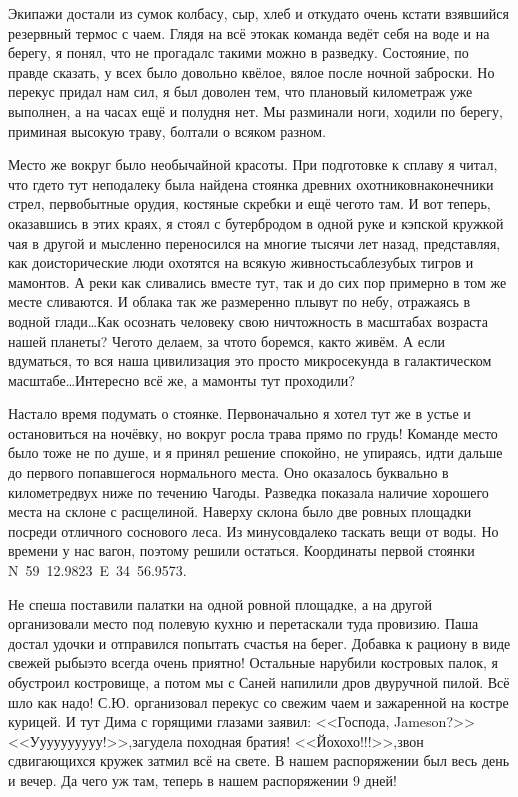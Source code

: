 Экипажи достали из сумок колбасу, сыр, хлеб и откуда\sdash то очень кстати взявшийся резервный термос с чаем. Глядя на всё это\mdash как команда ведёт себя на воде и на берегу, я понял, что не прогадал\mdash с такими можно в разведку. Состояние, по правде сказать, у всех было довольно квёлое, вялое после ночной заброски. Но перекус придал нам сил, я был доволен тем, что плановый километраж уже выполнен, а на часах ещё и полудня нет. Мы разминали ноги, ходили по берегу, приминая высокую траву, болтали о всяком разном.

Место же вокруг было необычайной красоты. При подготовке к сплаву я читал, что где\sdash то тут неподалеку была найдена стоянка древних охотников\mdash наконечники стрел, первобытные орудия, костяные скребки и ещё чего\sdash то там. И вот теперь, оказавшись в этих краях, я стоял с бутербродом в одной руке и кэпской кружкой чая в другой и мысленно переносился на многие тысячи лет назад, представляя, как доисторические люди охотятся на всякую живность\mdash саблезубых тигров и мамонтов. А реки как сливались вместе тут, так и до сих пор примерно в том же месте сливаются. И облака так же размеренно плывут по небу, отражаясь в водной глади\ldots Как осознать человеку свою ничтожность в масштабах возраста нашей планеты? Чего\sdash то делаем, за что\sdash то боремся, как\sdash то живём. А если вдуматься, то вся наша цивилизация \mdash это просто микросекунда в галактическом масштабе\ldots Интересно всё же, а мамонты тут проходили?

Настало время подумать о стоянке. Первоначально я хотел тут же в устье и остановиться на ночёвку, но вокруг росла трава прямо по грудь! Команде место было тоже не по душе, и я принял решение спокойно, не упираясь, идти дальше до первого попавшегося нормального места. Оно оказалось буквально в километре\sdash двух ниже по течению Чагоды. Разведка показала наличие хорошего места на склоне с расщелиной. Наверху склона было две ровных площадки посреди отличного соснового леса. Из минусов\mdash далеко таскать вещи от воды. Но времени у нас вагон, поэтому решили остаться. Координаты первой стоянки N~59\degree~12.9823\textprime~E~34\degree~56.9573\textprime. 

Не спеша поставили палатки на одной ровной площадке, а на другой организовали место под полевую кухню и перетаскали туда провизию. Паша достал удочки и отправился попытать счастья на берег. Добавка к рациону в виде свежей рыбы\mdash это всегда очень приятно! Остальные нарубили костровых палок, я обустроил костровище, а потом мы с Саней напилили дров двуручной пилой. Всё шло как надо! С.Ю. организовал перекус со свежим чаем и зажаренной на костре курицей. И тут Дима с горящими глазами заявил: <<Господа, Jameson?>> <<У\sdash у\sdash у\sdash у\sdash у\sdash у\sdash у\sdash у\sdash у\sdash у!>>,\mdash загудела походная братия! <<Йо\sdash хо\sdash хо!!!>>,\mdash звон сдвигающихся кружек затмил всё на свете. В нашем распоряжении был весь день и вечер. Да чего уж там, теперь в нашем распоряжении 9 дней! 

